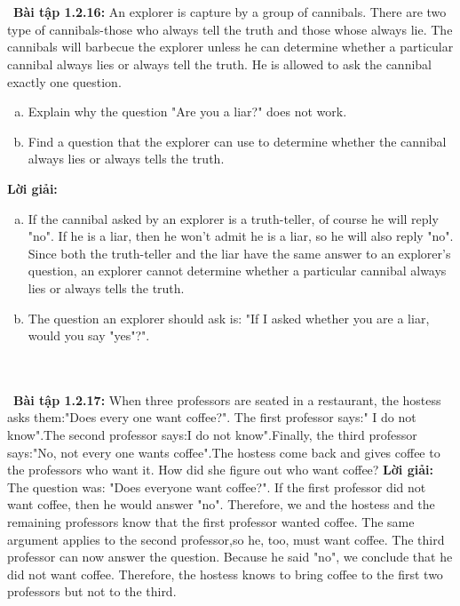 \documentclass[a4paper]{article}
\begin{document}
 \\\ \\\
\textbf{Bài tập 1.2.16:} An explorer is capture by a group of cannibals. There are two type of cannibals-those who always tell the truth and those whose always lie. The cannibals will barbecue the explorer unless he can determine whether a particular cannibal always lies or always tell the truth. He is allowed to ask the cannibal exactly one question.
\begin{enumerate}[a)]
\item Explain why the question "Are you a liar?" does not work.
\item Find a question that the explorer can use to determine whether the cannibal always lies or always tells the truth.  
\end{enumerate}
\textbf{Lời giải: } \begin{enumerate}[a)]
\item If the cannibal asked by an explorer is a truth-teller, of course he will reply "no". If he is a liar, then he won't admit he is a liar, so he will also reply "no". Since both the truth-teller and the liar have the same answer to an explorer's question, an explorer cannot determine whether a particular cannibal always lies or always tells the truth.
\item The question an explorer should ask is: "If I asked whether you are a liar, would you say "yes"?". 
\end{enumerate} \\\ \\\
\textbf{Bài tập 1.2.17:}  When three professors are seated in a restaurant, the hostess asks them:"Does every one want coffee?". The first professor says:" I do not know".The second professor says:I do not know".Finally, the third professor says:"No, not every one wants coffee".The hostess come back and gives coffee to the professors who want it. How did she figure out who want coffee?
\textbf{Lời giải: } \\The question was: "Does everyone want coffee?". If the first professor did not want coffee, then he would answer "no". Therefore, we and the hostess and the remaining professors know that the first professor wanted coffee. The same argument applies to the second professor,so he, too, must want coffee. The third professor can now answer the question. Because he said "no", we conclude that he did not want coffee. Therefore, the hostess knows to bring coffee to the first two professors but not to the third. \\\ \\\
\end{document}
